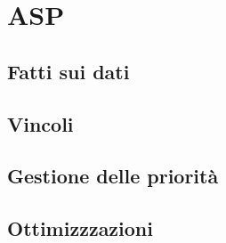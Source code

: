 \section{ASP}\label{sec:asp}

\subsection{Fatti sui dati}\label{sec:facts}
\subsection{Vincoli}\label{sec:constraints}
\subsection{Gestione delle priorità}\label{sec:priorita}
\subsection{Ottimizzzazioni}\label{sec:optimizations}
